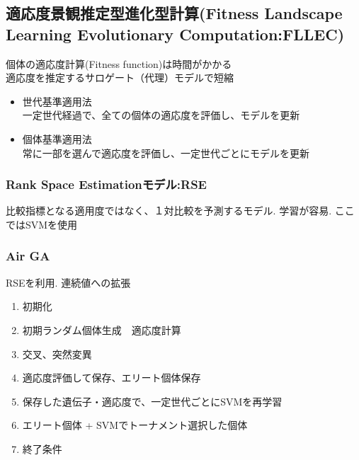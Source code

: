 \documentclass[twocolumn]{jarticle}     %
\begin{document}
\subsection{適応度景観推定型進化型計算(Fitness Landscape Learning Evolutionary Computation:FLLEC)}
個体の適応度計算(Fitness function)は時間がかかる\\
適応度を推定するサロゲート（代理）モデルで短縮

\begin{itemize}
  \item 世代基準適用法\\
    一定世代経過で、全ての個体の適応度を評価し、モデルを更新
  \item 個体基準適用法\\
    常に一部を選んで適応度を評価し、一定世代ごとにモデルを更新
\end{itemize}

%
%

\subsubsection{Rank Space Estimationモデル:RSE}
比較指標となる適用度ではなく、１対比較を予測するモデル. 学習が容易.
ここではSVMを使用

\subsubsection{Air GA}
RSEを利用. 連続値への拡張
\begin{enumerate}
  \item 初期化
  \item 初期ランダム個体生成　適応度計算
  \item 交叉、突然変異
  \item 適応度評価して保存、エリート個体保存
  \item 保存した遺伝子・適応度で、一定世代ごとにSVMを再学習
  \item エリート個体 + SVMでトーナメント選択した個体
  \item 終了条件
\end{enumerate}
\end{document}
